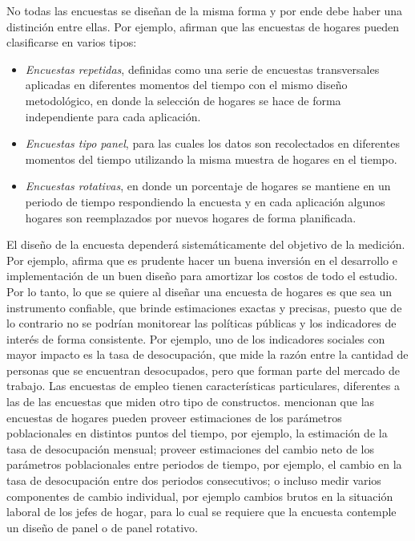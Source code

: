 \documentclass[
  12pt,
  spanish,
]{book}
\providecommand{\tightlist}{%
  \setlength{\itemsep}{0pt}\setlength{\parskip}{0pt}}
\begin{document}
No todas las encuestas se diseñan de la misma forma y por ende debe haber una distinción entre ellas. Por ejemplo, \citet{Kalton_Citro_1993} afirman que las encuestas de hogares pueden clasificarse en varios tipos:

\begin{itemize}
\tightlist
\item
  \emph{Encuestas repetidas}, definidas como una serie de encuestas transversales aplicadas en diferentes momentos del tiempo con el mismo diseño metodológico, en donde la selección de hogares se hace de forma independiente para cada aplicación.
\item
  \emph{Encuestas tipo panel}, para las cuales los datos son recolectados en diferentes momentos del tiempo utilizando la misma muestra de hogares en el tiempo.
\item
  \emph{Encuestas rotativas}, en donde un porcentaje de hogares se mantiene en un periodo de tiempo respondiendo la encuesta y en cada aplicación algunos hogares son reemplazados por nuevos hogares de forma planificada.
\end{itemize}

El diseño de la encuesta dependerá sistemáticamente del objetivo de la medición. Por ejemplo, \citet{Kalton_2009} afirma que es prudente hacer un buena inversión en el desarrollo e implementación de un buen diseño para amortizar los costos de todo el estudio. Por lo tanto, lo que se quiere al diseñar una encuesta de hogares es que sea un instrumento confiable, que brinde estimaciones exactas y precisas, puesto que de lo contrario no se podrían monitorear las políticas públicas y los indicadores de interés de forma consistente. Por ejemplo, uno de los indicadores sociales con mayor impacto es la tasa de desocupación, que mide la razón entre la cantidad de personas que se encuentran desocupados, pero que forman parte del mercado de trabajo. Las encuestas de empleo tienen características particulares, diferentes a las de las encuestas que miden otro tipo de constructos. \citet{Duncan_Kalton_1987} mencionan que las encuestas de hogares pueden proveer estimaciones de los parámetros poblacionales en distintos puntos del tiempo, por ejemplo, la estimación de la tasa de desocupación mensual; proveer estimaciones del cambio neto de los parámetros poblacionales entre periodos de tiempo, por ejemplo, el cambio en la tasa de desocupación entre dos periodos consecutivos; o incluso medir varios componentes de cambio individual, por ejemplo cambios brutos en la situación laboral de los jefes de hogar, para lo cual se requiere que la encuesta contemple un diseño de panel o de panel rotativo.
\end{document}
